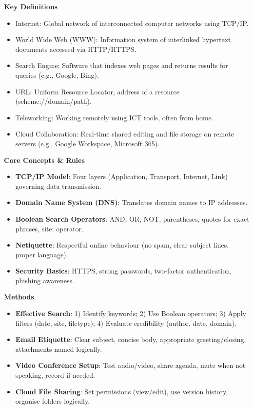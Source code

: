 \documentclass[11pt]{article}
\newcommand{\cle}[1]{{\popxbold\color{popdark}#1}}
\begin{document}
\begin{bilan}
\textbf{Key Definitions}
\begin{itemize}
\item \cle{Internet}: Global network of interconnected computer networks using TCP/IP.
\item \cle{World Wide Web (WWW)}: Information system of interlinked hypertext documents accessed via HTTP/HTTPS.
\item \cle{Search Engine}: Software that indexes web pages and returns results for queries (e.g., Google, Bing).
\item \cle{URL}: Uniform Resource Locator, address of a resource (scheme://domain/path).
\item \cle{Teleworking}: Working remotely using ICT tools, often from home.
\item \cle{Cloud Collaboration}: Real-time shared editing and file storage on remote servers (e.g., Google Workspace, Microsoft 365).
\end{itemize}

\textbf{Core Concepts \& Rules}
\begin{itemize}
\item \textbf{TCP/IP Model}: Four layers (Application, Transport, Internet, Link) governing data transmission.
\item \textbf{Domain Name System (DNS)}: Translates domain names to IP addresses.
\item \textbf{Boolean Search Operators}: AND, OR, NOT, parentheses, quotes for exact phrases, site: operator.
\item \textbf{Netiquette}: Respectful online behaviour (no spam, clear subject lines, proper language).
\item \textbf{Security Basics}: HTTPS, strong passwords, two-factor authentication, phishing awareness.
\end{itemize}

\textbf{Methods}
\begin{itemize}
\item \textbf{Effective Search}: 1) Identify keywords; 2) Use Boolean operators; 3) Apply filters (date, site, filetype); 4) Evaluate credibility (author, date, domain).
\item \textbf{Email Etiquette}: Clear subject, concise body, appropriate greeting/closing, attachments named logically.
\item \textbf{Video Conference Setup}: Test audio/video, share agenda, mute when not speaking, record if needed.
\item \textbf{Cloud File Sharing}: Set permissions (view/edit), use version history, organise folders logically.
\end{itemize}


\end{bilan}
\end{document}
